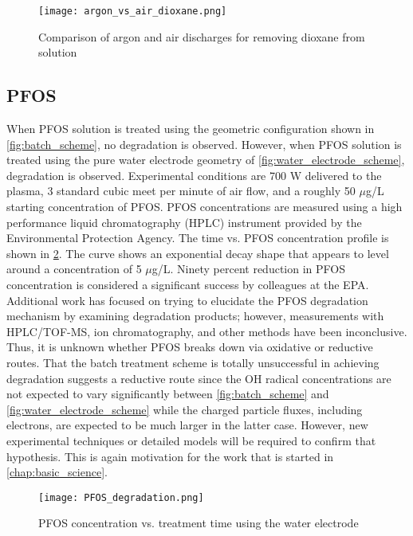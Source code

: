 \begin{figure}[htbp]
  \centering
  \texttt{[image: argon\_vs\_air\_dioxane.png]}
  \caption{Comparison of argon and air discharges for removing dioxane from solution}
  \label{fig:diox_compare_argon_air}
\end{figure}

\subsection{PFOS}
\label{sec:PFOS}

 When PFOS solution is treated using the geometric configuration shown in \cref{fig:batch_scheme}, no degradation is observed.  However, when PFOS solution is treated using the pure water electrode geometry of \cref{fig:water_electrode_scheme}, degradation is observed. Experimental conditions are 700 W delivered to the plasma, 3 standard cubic meet per minute of air flow, and a roughly 50 $\mu$g/L starting concentration of PFOS. PFOS concentrations are measured using a high performance liquid chromatography (HPLC) instrument provided by the Environmental Protection Agency. The time vs. PFOS concentration profile is shown in \cref{fig:PFOS_degradation}. The curve shows an exponential decay shape that appears to level around a concentration of 5 $\mu$g/L. Ninety percent reduction in PFOS concentration is considered a significant success by colleagues at the EPA. Additional work has focused on trying to elucidate the PFOS degradation mechanism by examining degradation products; however, measurements with HPLC/TOF-MS, ion chromatography, and other methods have been inconclusive. Thus, it is unknown whether PFOS breaks down via oxidative or reductive routes. That the batch treatment scheme is totally unsuccessful in achieving degradation suggests a reductive route since the OH radical concentrations are not expected to vary significantly between \cref{fig:batch_scheme} and \cref{fig:water_electrode_scheme} while the charged particle fluxes, including electrons, are expected to be much larger in the latter case. However, new experimental techniques or detailed models will be required to confirm that hypothesis. This is again motivation for the work that is started in \cref{chap:basic_science}.

\begin{figure}[htbp]
  \centering
  \texttt{[image: PFOS\_degradation.png]}
  \caption{PFOS concentration vs. treatment time using the water electrode}
  \label{fig:PFOS_degradation}
\end{figure}

